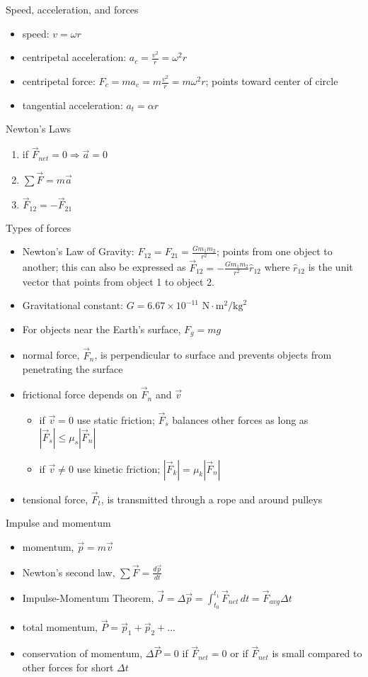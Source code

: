 \documentclass[11pt,letterpaper]{article}
\begin{document}
\clearpage
\noindent Speed, acceleration, and forces
\begin{itemize}
\item speed: $v=\omega{r}$
\item centripetal acceleration: $a_c=\displaystyle\frac{v^2}{r}=\omega^2r$
\item centripetal force: $F_c=ma_c=m\displaystyle\frac{v^2}{r}=m\omega^2r$; points toward center of circle
\item tangential acceleration: $a_t=\alpha{r}$
\end{itemize}
Newton's Laws
\begin{enumerate}
\item if $\vec{F}_{net}=0\Rightarrow \vec{a}=0$
\item $\displaystyle\sum\vec{F}=m\vec{a}$
\item $\vec{F}_{12}=-\vec{F}_{21}$
\end{enumerate}
Types of forces
\begin{itemize}
\item Newton's Law of Gravity: $F_{12}=F_{21}=\displaystyle\frac{Gm_1m_2}{r^2}$; points from one object to another; this can also be expressed as $\vec{F}_{12}=\displaystyle-\frac{Gm_1m_2}{r^2}\hat{r}_{12}$ where $\hat{r}_{12}$ is the unit vector that points from object 1 to object 2.
\item Gravitational constant: $G=6.67\times{10}^{-11}\mbox{ N}\cdot\mbox{m}^2/\mbox{kg}^2$
\item For objects near the Earth's surface, $F_g=mg$
\item normal force, $\vec{F}_n$, is perpendicular to surface and prevents objects from penetrating the surface
\item frictional force depends on $\vec{F}_n$ and $\vec{v}$
\begin{itemize}
\item if $\vec{v}=0$ use static friction; $\vec{F}_s$ balances other forces as long as $\left|\vec{F}_s\right|\leq\mu_s\left|\vec{F}_n\right|$
\item if $\vec{v}\neq{0}$ use kinetic friction; $\left|\vec{F}_k\right|=\mu_k\left|\vec{F}_n\right|$
\end{itemize}
\item tensional force, $\vec{F}_t$, is transmitted through a rope and around pulleys
\end{itemize}
Impulse and momentum
\begin{itemize}
\item momentum, $\vec{p}=m\vec{v}$
\item Newton's second law, $\displaystyle\sum\vec{F}=\displaystyle\frac{d\vec{p}}{dt}$
\item Impulse-Momentum Theorem, $\vec{J}=\Delta{\vec{p}}=\displaystyle\int_{t_0}^{t_1}\vec{F}_{net}\,dt=\vec{F}_{avg}\Delta{t}$
\item total momentum, $\vec{P}=\vec{p}_1+\vec{p}_2+...$
\item conservation of momentum, $\Delta{\vec P}=0$ if $\vec{F}_{net}=0$ or if $\vec{F}_{net}$ is small compared to other forces for short $\Delta{t}$
\end{itemize}
\end{document}
